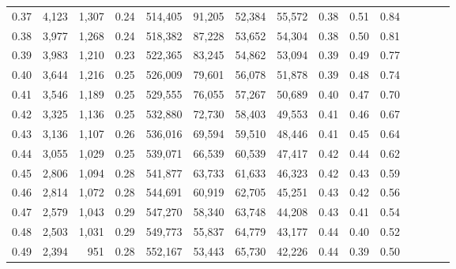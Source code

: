 \begin{tabular}{rrrcrrrrrrrrrrr}
0.37 &   4,123 &   1,307 &                                       0.24 &  514,405 &   91,205 &   52,384 &   55,572 &  0.38 &  0.51 &                         0.84 \\
0.38 &   3,977 &   1,268 &                                       0.24 &  518,382 &   87,228 &   53,652 &   54,304 &  0.38 &  0.50 &                         0.81 \\
0.39 &   3,983 &   1,210 &                                       0.23 &  522,365 &   83,245 &   54,862 &   53,094 &  0.39 &  0.49 &                         0.77 \\
0.40 &   3,644 &   1,216 &                                       0.25 &  526,009 &   79,601 &   56,078 &   51,878 &  0.39 &  0.48 &                         0.74 \\
0.41 &   3,546 &   1,189 &                                       0.25 &  529,555 &   76,055 &   57,267 &   50,689 &  0.40 &  0.47 &                         0.70 \\
0.42 &   3,325 &   1,136 &                                       0.25 &  532,880 &   72,730 &   58,403 &   49,553 &  0.41 &  0.46 &                         0.67 \\
0.43 &   3,136 &   1,107 &                                       0.26 &  536,016 &   69,594 &   59,510 &   48,446 &  0.41 &  0.45 &                         0.64 \\
0.44 &   3,055 &   1,029 &                                       0.25 &  539,071 &   66,539 &   60,539 &   47,417 &  0.42 &  0.44 &                         0.62 \\
0.45 &   2,806 &   1,094 &                                       0.28 &  541,877 &   63,733 &   61,633 &   46,323 &  0.42 &  0.43 &                         0.59 \\
0.46 &   2,814 &   1,072 &                                       0.28 &  544,691 &   60,919 &   62,705 &   45,251 &  0.43 &  0.42 &                         0.56 \\
0.47 &   2,579 &   1,043 &                                       0.29 &  547,270 &   58,340 &   63,748 &   44,208 &  0.43 &  0.41 &                         0.54 \\
0.48 &   2,503 &   1,031 &                                       0.29 &  549,773 &   55,837 &   64,779 &   43,177 &  0.44 &  0.40 &                         0.52 \\
0.49 &   2,394 &     951 &                                       0.28 &  552,167 &   53,443 &   65,730 &   42,226 &  0.44 &  0.39 &                         0.50 \\

\end{tabular}
